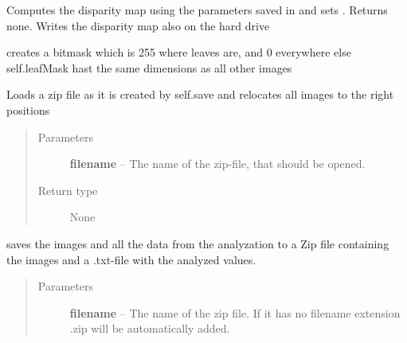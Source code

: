 \documentclass[a4paper,10pt,openany,oneside]{sphinxmanual}
\begin{document}
\begin{fulllineitems}

\begin{fulllineitems}
\label{index:scripts.measurement.measurement.computeDisparity}
Computes the disparity map using the parameters saved in 
and sets . Returns none. Writes the disparity map also on the
hard drive

\end{fulllineitems}


\begin{fulllineitems}
\label{index:scripts.measurement.measurement.maskLeaves}
creates a bitmask which is 255 where leaves are, and 0 everywhere else
self.leafMask hast the same dimensions as all other images

\end{fulllineitems}


\begin{fulllineitems}
\label{index:scripts.measurement.measurement.open}
Loads a zip file as it is created by self.save and relocates all images to the right positions
\begin{quote}\begin{description}
\item[{Parameters}] \leavevmode
\textbf{filename} -- The name of the zip-file, that should be opened.

\item[{Return type}] \leavevmode
None

\end{description}\end{quote}

\end{fulllineitems}


\begin{fulllineitems}
\label{index:scripts.measurement.measurement.save}
saves the images and all the data from the analyzation to a Zip file
containing the images and a .txt-file with the analyzed values.
\begin{quote}\begin{description}
\item[{Parameters}] \leavevmode
\textbf{filename} -- The name of the zip file. If it has no filename extension .zip will be automatically added.


\end{description}
\end{quote}
\end{fulllineitems}
\end{fulllineitems}
\end{document}
